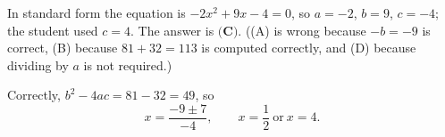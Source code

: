 In standard form the equation is $-2x^2+9x-4=0$, so $a=-2$, $b=9$, $c=-4$; the student used $c=4$. The answer is $\boxed{\textbf{(C)}}$. ((A) is wrong because $-b=-9$ is correct, (B) because $81+32=113$ is computed correctly, and (D) because dividing by $a$ is not required.)

Correctly, $b^2-4ac=81-32=49$, so
\[x=\dfrac{-9\pm7}{-4},\qquad x=\boxed{\dfrac12}\ \text{or}\ x=\boxed{4}.\]
